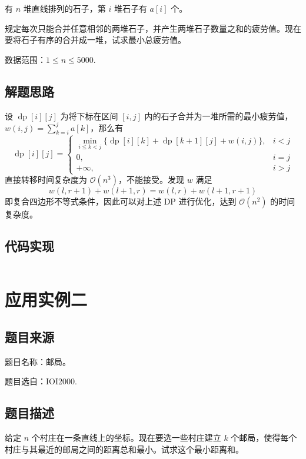 有 \(n\) 堆直线排列的石子，第 \(i\) 堆石子有 \(a[i]\) 个。

规定每次只能合并任意相邻的两堆石子，并产生两堆石子数量之和的疲劳值。现在要将石子有序的合并成一堆，试求最小总疲劳值。

数据范围：\(1\le n\le 5000\).

\subsection{解题思路}

设 \(\operatorname{dp}[i][j]\) 为将下标在区间 \([i,j]\)
内的石子合并为一堆所需的最小疲劳值，\(w(i,j)=\sum_{k=i}^ja[k]\)，那么有
\[
\operatorname{dp}[i][j]=
\left\{
\begin{array}{ll}
\min\limits_{i\le k < j}\{\operatorname{dp}[i][k]+\operatorname{dp}[k+1][j]+w(i,j)\},&i < j\\
0,&i=j\\
+\infty, &i>j
\end{array}
\right.
\] 直接转移时间复杂度为 \(\mathcal{O}(n^3)\)，不能接受。发现 \(w\) 满足
\[
w(l,r+1)+w(l+1,r)=w(l,r)+w(l+1,r+1)
\] 即复合四边形不等式条件，因此可以对上述 DP 进行优化，达到
\(\mathcal{O}(n^2)\) 的时间复杂度。

\subsection{代码实现}

\inputminted[frame=lines, numbers=left, fontsize=\scriptsize, tabsize=4, breaklines=true]{c++}{code/7.cpp}

\section{应用实例二}

\subsection{题目来源}

题目名称：邮局。

题目选自：IOI2000.

\subsection{题目描述}

给定 \(n\) 个村庄在一条直线上的坐标。现在要选一些村庄建立 \(k\)
个邮局，使得每个村庄与其最近的邮局之间的距离总和最小。试求这个最小距离和。

